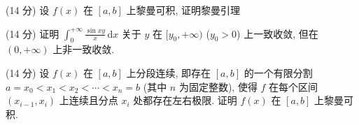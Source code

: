 (14 分) 设 $f(x)$ 在 $[a, b]$ 上黎曼可积, 证明黎曼引理\par
\nopagebreak[4]
(14 分) 证明 $\int_0^{+\infty} \frac{\sin xy}{x} \, \mathrm{d}x$ 关于 $y$ 在 $[y_0, +\infty)$ ($y_0 > 0$) 上一致收敛, 但在 $(0, +\infty)$ 上非一致收敛.\par
(14 分) 设 $f(x)$ 在 $[a, b]$ 上分段连续, 即存在 $[a, b]$ 的一个有限分割 $a = x_0 < x_1 < x_2 < \cdots < x_n = b$ (其中 $n$ 为固定整数), 使得 $f$ 在每个区间 $(x_{i-1}, x_i)$ 上连续且分点 $x_i$ 处都存在左右极限. 证明 $f(x)$ 在 $[a, b]$ 上黎曼可积.\par
